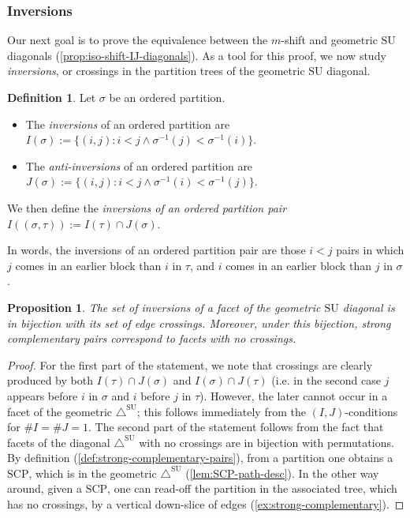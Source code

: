 \documentclass{amsart}
\newcommand{\darkblue}{\color{darkblue}} %
\newtheorem{proposition}[theorem]{Proposition}
\theoremstyle{definition}
\newtheorem{definition}[theorem]{Definition}
\newcommand{\card}[1]{\##1} %
\newcommand{\defn}[1]{\textsl{\darkblue #1}} %
\newcommand{\SU}{\mathrm{SU}}
\newcommand{\SUD}{\triangle^{\mathrm{SU}}}
\newcommand{\SCP}{\mathrm{SCP}}
\begin{document}

\subsubsection{Inversions}
\label{subsec:inversions}

Our next goal is to prove the equivalence between the $m$-shift and geometric $\SU$ diagonals (\cref{prop:iso-shift-IJ-diagonals}).
As a tool for this proof, we now study \emph{inversions}, or crossings in the partition trees of the geometric $\SU$ diagonal.

\begin{definition}\label{def:inverions}
Let $\sigma$ be an ordered partition.
\begin{itemize}
    \item The \defn{inversions} of an ordered partition are $I(\sigma):= \{(i,j): i<j \land \sigma^{-1}(j)<\sigma^{-1}(i) \}$.
    \item The \defn{anti-inversions} of an ordered partition are $J(\sigma):= \{(i,j): i<j \land \sigma^{-1}(i)< \sigma^{-1}(j) \}$.
\end{itemize}
We then define the \defn{inversions of an ordered partition pair} $I((\sigma,\tau)):=I(\tau)\cap J(\sigma)$. 
\end{definition}
In words, the inversions of an ordered partition pair are those $i<j$ pairs in which $j$ comes in an earlier block than $i$ in $\tau$, and $i$ comes in an earlier block than $j$ in $\sigma$. 

\begin{proposition}
\label{p:crossings}
The set of inversions of a facet of the geometric $\SU$ diagonal is in bijection with its set of edge crossings. 
Moreover, under this bijection, strong complementary pairs correspond to facets with no crossings.
\end{proposition}

\begin{proof}
For the first part of the statement,
we note that crossings are clearly produced by both $I(\tau)\cap J(\sigma)$ and $I(\sigma)\cap J(\tau)$ (i.e. in the second case $j$ appears before $i$ in $\sigma$ and $i$ before $j$ in $\tau$).
However, the later cannot occur in a facet of the geometric $\SUD$; this follows immediately from the $(I,J)$-conditions for $\card{I} = \card{J} = 1$. 
The second part of the statement follows from the fact that facets of the diagonal $\SUD$ with no crossings are in bijection with permutations.
By definition (\cref{def:strong-complementary-pairs}), from a partition one obtains a $\SCP$, which is in the geometric $\SUD$ (\cref{lem:SCP-path-desc}). 
In the other way around, given a $\SCP$, one can read-off the partition in the associated tree, which has no crossings, by a vertical down-slice of edges (\cref{ex:strong-complementary}).
\end{proof}
\end{document}

